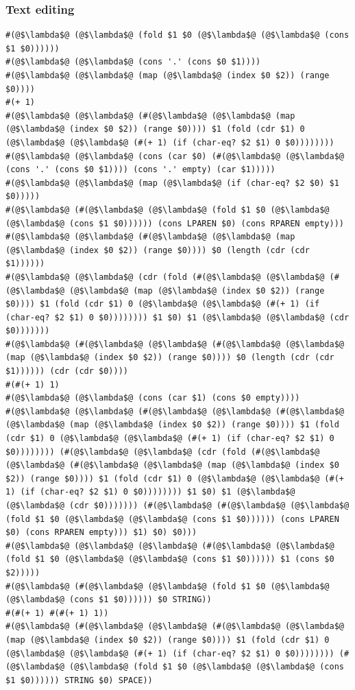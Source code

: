 \documentclass{article}
\begin{document}
\subsubsection{Text editing}
\begin{lstlisting}
#(@$\lambda$@ (@$\lambda$@ (fold $1 $0 (@$\lambda$@ (@$\lambda$@ (cons $1 $0))))))
#(@$\lambda$@ (@$\lambda$@ (cons '.' (cons $0 $1))))
#(@$\lambda$@ (@$\lambda$@ (map (@$\lambda$@ (index $0 $2)) (range $0))))
#(+ 1)
#(@$\lambda$@ (@$\lambda$@ (#(@$\lambda$@ (@$\lambda$@ (map (@$\lambda$@ (index $0 $2)) (range $0)))) $1 (fold (cdr $1) 0 (@$\lambda$@ (@$\lambda$@ (#(+ 1) (if (char-eq? $2 $1) 0 $0))))))))
#(@$\lambda$@ (@$\lambda$@ (cons (car $0) (#(@$\lambda$@ (@$\lambda$@ (cons '.' (cons $0 $1)))) (cons '.' empty) (car $1)))))
#(@$\lambda$@ (@$\lambda$@ (map (@$\lambda$@ (if (char-eq? $2 $0) $1 $0)))))
#(@$\lambda$@ (#(@$\lambda$@ (@$\lambda$@ (fold $1 $0 (@$\lambda$@ (@$\lambda$@ (cons $1 $0)))))) (cons LPAREN $0) (cons RPAREN empty)))
#(@$\lambda$@ (@$\lambda$@ (#(@$\lambda$@ (@$\lambda$@ (map (@$\lambda$@ (index $0 $2)) (range $0)))) $0 (length (cdr (cdr $1))))))
#(@$\lambda$@ (@$\lambda$@ (cdr (fold (#(@$\lambda$@ (@$\lambda$@ (#(@$\lambda$@ (@$\lambda$@ (map (@$\lambda$@ (index $0 $2)) (range $0)))) $1 (fold (cdr $1) 0 (@$\lambda$@ (@$\lambda$@ (#(+ 1) (if (char-eq? $2 $1) 0 $0)))))))) $1 $0) $1 (@$\lambda$@ (@$\lambda$@ (cdr $0)))))))
#(@$\lambda$@ (#(@$\lambda$@ (@$\lambda$@ (#(@$\lambda$@ (@$\lambda$@ (map (@$\lambda$@ (index $0 $2)) (range $0)))) $0 (length (cdr (cdr $1)))))) (cdr (cdr $0))))
#(#(+ 1) 1)
#(@$\lambda$@ (@$\lambda$@ (cons (car $1) (cons $0 empty))))
#(@$\lambda$@ (@$\lambda$@ (#(@$\lambda$@ (@$\lambda$@ (#(@$\lambda$@ (@$\lambda$@ (map (@$\lambda$@ (index $0 $2)) (range $0)))) $1 (fold (cdr $1) 0 (@$\lambda$@ (@$\lambda$@ (#(+ 1) (if (char-eq? $2 $1) 0 $0)))))))) (#(@$\lambda$@ (@$\lambda$@ (cdr (fold (#(@$\lambda$@ (@$\lambda$@ (#(@$\lambda$@ (@$\lambda$@ (map (@$\lambda$@ (index $0 $2)) (range $0)))) $1 (fold (cdr $1) 0 (@$\lambda$@ (@$\lambda$@ (#(+ 1) (if (char-eq? $2 $1) 0 $0)))))))) $1 $0) $1 (@$\lambda$@ (@$\lambda$@ (cdr $0))))))) (#(@$\lambda$@ (#(@$\lambda$@ (@$\lambda$@ (fold $1 $0 (@$\lambda$@ (@$\lambda$@ (cons $1 $0)))))) (cons LPAREN $0) (cons RPAREN empty))) $1) $0) $0)))
#(@$\lambda$@ (@$\lambda$@ (@$\lambda$@ (#(@$\lambda$@ (@$\lambda$@ (fold $1 $0 (@$\lambda$@ (@$\lambda$@ (cons $1 $0)))))) $1 (cons $0 $2)))))
#(@$\lambda$@ (#(@$\lambda$@ (@$\lambda$@ (fold $1 $0 (@$\lambda$@ (@$\lambda$@ (cons $1 $0)))))) $0 STRING))
#(#(+ 1) #(#(+ 1) 1))
#(@$\lambda$@ (#(@$\lambda$@ (@$\lambda$@ (#(@$\lambda$@ (@$\lambda$@ (map (@$\lambda$@ (index $0 $2)) (range $0)))) $1 (fold (cdr $1) 0 (@$\lambda$@ (@$\lambda$@ (#(+ 1) (if (char-eq? $2 $1) 0 $0)))))))) (#(@$\lambda$@ (@$\lambda$@ (fold $1 $0 (@$\lambda$@ (@$\lambda$@ (cons $1 $0)))))) STRING $0) SPACE))

\end{lstlisting}
\end{document}
